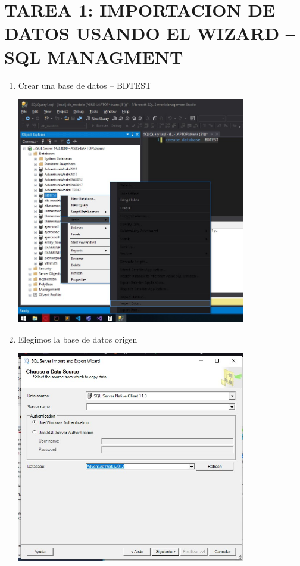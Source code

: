 \section{TAREA 1: IMPORTACION DE DATOS USANDO EL WIZARD – SQL MANAGMENT} 

\begin{enumerate}
    \item Crear una base de datos – BDTEST
        \begin{center}
             \includegraphics[width=10cm]{imagenes/importa_data_1.jpg}
        \end{center}
        
     \item Elegimos la base de datos origen
        \begin{center}
             \includegraphics[width=10cm]{imagenes/importa_data_2.jpg}
        \end{center}
        

\end{enumerate}
